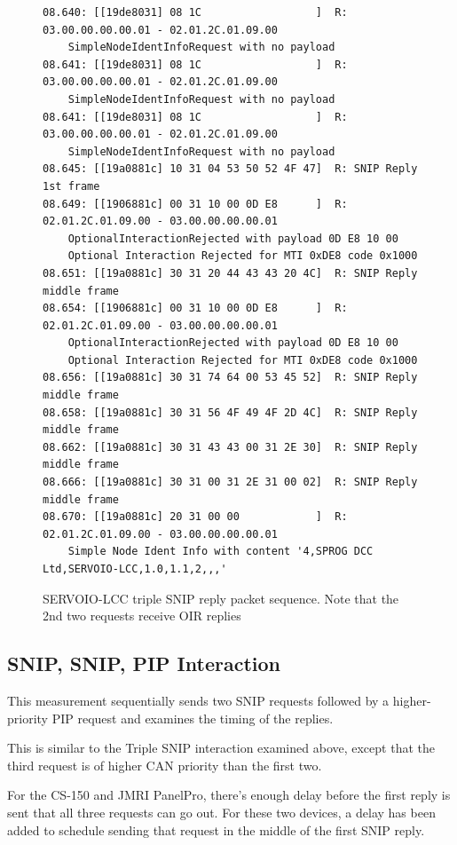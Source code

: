 \documentclass[11pt]{article}
\begin{document}
\begin{figure}[!htbp]
\begin{verbatim}
08.640: [[19de8031] 08 1C                  ]  R: 03.00.00.00.00.01 - 02.01.2C.01.09.00 
    SimpleNodeIdentInfoRequest with no payload
08.641: [[19de8031] 08 1C                  ]  R: 03.00.00.00.00.01 - 02.01.2C.01.09.00 
    SimpleNodeIdentInfoRequest with no payload
08.641: [[19de8031] 08 1C                  ]  R: 03.00.00.00.00.01 - 02.01.2C.01.09.00 
    SimpleNodeIdentInfoRequest with no payload
08.645: [[19a0881c] 10 31 04 53 50 52 4F 47]  R: SNIP Reply 1st frame
08.649: [[1906881c] 00 31 10 00 0D E8      ]  R: 02.01.2C.01.09.00 - 03.00.00.00.00.01 
    OptionalInteractionRejected with payload 0D E8 10 00 
    Optional Interaction Rejected for MTI 0xDE8 code 0x1000
08.651: [[19a0881c] 30 31 20 44 43 43 20 4C]  R: SNIP Reply middle frame
08.654: [[1906881c] 00 31 10 00 0D E8      ]  R: 02.01.2C.01.09.00 - 03.00.00.00.00.01 
    OptionalInteractionRejected with payload 0D E8 10 00 
    Optional Interaction Rejected for MTI 0xDE8 code 0x1000
08.656: [[19a0881c] 30 31 74 64 00 53 45 52]  R: SNIP Reply middle frame
08.658: [[19a0881c] 30 31 56 4F 49 4F 2D 4C]  R: SNIP Reply middle frame
08.662: [[19a0881c] 30 31 43 43 00 31 2E 30]  R: SNIP Reply middle frame
08.666: [[19a0881c] 30 31 00 31 2E 31 00 02]  R: SNIP Reply middle frame
08.670: [[19a0881c] 20 31 00 00            ]  R: 02.01.2C.01.09.00 - 03.00.00.00.00.01 
    Simple Node Ident Info with content '4,SPROG DCC Ltd,SERVOIO-LCC,1.0,1.1,2,,,'
\end{verbatim}
\caption{SERVOIO-LCC triple SNIP reply packet sequence.
Note that the 2nd two requests receive OIR replies}
\label{fig:SERVOIO_Triple_SNIP_reply_sequence}
\end{figure}






\clearpage

\subsection{SNIP, SNIP, PIP Interaction}

This measurement sequentially sends two SNIP requests followed by a higher-priority PIP request
and examines the timing of the replies.

This is similar to the Triple SNIP interaction examined above, except that
the third request is of higher CAN priority than the first two.

For the CS-150 and JMRI PanelPro, there's enough delay before the first reply is 
sent that all three requests can go out.  
For these two devices, a delay has been added to schedule sending that 
request in the middle of the first SNIP reply.
\end{document}
